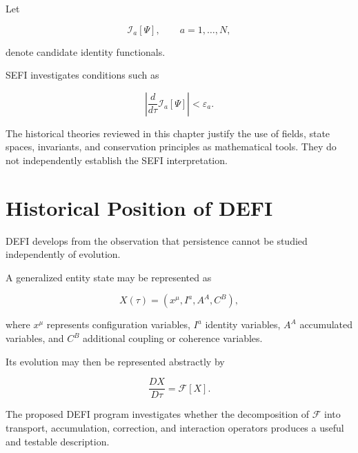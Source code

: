 \documentclass[12pt,oneside]{book}
\begin{document}
Let

\begin{equation}
    \mathcal{I}_a[\Psi],
    \qquad
    a=1,\ldots,N,
\end{equation}

denote candidate identity functionals.

SEFI investigates conditions such as

\begin{equation}
    \left|
        \frac{d}{d\tau}
        \mathcal{I}_a[\Psi]
    \right|
    <
    \varepsilon_a.
    \label{eq:sefi-historical-condition}
\end{equation}

The historical theories reviewed in this chapter justify the
use of fields, state spaces, invariants, and conservation
principles as mathematical tools. They do not independently
establish the SEFI interpretation.


\section{Historical Position of DEFI}
\label{sec:historical-position-defi}

DEFI develops from the observation that persistence cannot be
studied independently of evolution.

A generalized entity state may be represented as

\begin{equation}
    X(\tau)
    =
    \left(
        x^\mu,
        I^a,
        A^A,
        C^B
    \right),
    \label{eq:defi-generalized-state}
\end{equation}

where \(x^\mu\) represents configuration variables,
\(I^a\) identity variables, \(A^A\) accumulated variables, and
\(C^B\) additional coupling or coherence variables.

Its evolution may then be represented abstractly by

\begin{equation}
    \frac{DX}{D\tau}
    =
    \mathcal{F}[X].
    \label{eq:defi-evolution}
\end{equation}

The proposed DEFI program investigates whether the decomposition
of \(\mathcal{F}\) into transport, accumulation, correction, and
interaction operators produces a useful and testable
description.
\end{document}
